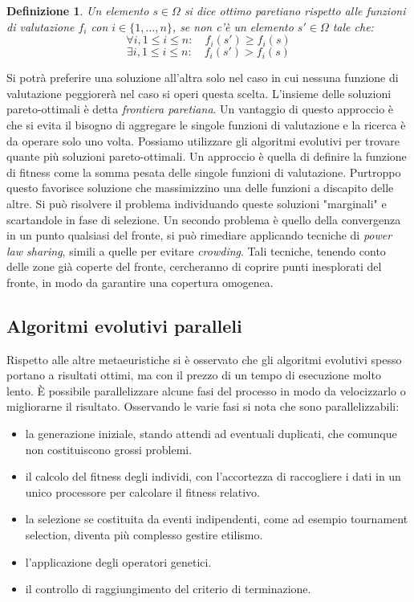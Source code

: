 \documentclass[10pt,a4paper]{article}
\newtheorem{definition}{Definizione}
\begin{document}
\begin{definition}
Un elemento $s \in \Omega$ si dice \emph{ottimo paretiano} rispetto alle funzioni di valutazione $f_i$ con $i \in \{1, \dots, n\}$, se non c'è un elemento $s' \in \Omega$ tale che:
$$
\forall i, 1 \leq i \leq n: \quad f_i(s') \geq f_i(s)
$$ 
$$
\exists i, 1 \leq i \leq n: \quad f_i(s') > f_i(s)
$$
\end{definition}

Si potrà preferire una soluzione all'altra solo nel caso in cui nessuna funzione di valutazione peggiorerà nel caso si operi questa scelta. L'insieme delle soluzioni pareto-ottimali è detta \emph{frontiera paretiana}. Un vantaggio di questo approccio è che si evita il bisogno di aggregare le singole funzioni di valutazione e la ricerca è da operare solo uno volta. Possiamo utilizzare gli algoritmi evolutivi per trovare quante più soluzioni pareto-ottimali. Un approccio è quella di definire la funzione di fitness come la somma pesata delle singole funzioni di valutazione. Purtroppo questo favorisce soluzione che massimizzino una delle funzioni a discapito delle altre. Si può risolvere il problema individuando queste soluzioni "marginali" e scartandole in fase di selezione. Un secondo problema è quello della convergenza in un punto qualsiasi del fronte, si può rimediare applicando tecniche di \emph{power law sharing}, simili a quelle per evitare \emph{crowding}. Tali tecniche, tenendo conto delle zone già coperte del fronte, cercheranno di coprire punti inesplorati del fronte, in modo da garantire una copertura omogenea.

\subsection{Algoritmi evolutivi paralleli}

Rispetto alle altre metaeuristiche si è osservato che gli algoritmi evolutivi spesso portano a risultati ottimi, ma con il prezzo di un tempo di esecuzione molto lento.
È possibile parallelizzare alcune fasi del processo in modo da velocizzarlo o migliorarne il risultato. Osservando le varie fasi si nota che sono parallelizzabili:

\begin{itemize}
\item{la generazione iniziale, stando attendi ad eventuali duplicati, che comunque non costituiscono grossi problemi.}
\item{il calcolo del fitness degli individi, con l’accortezza di raccogliere i dati in un unico processore per calcolare il fitness relativo.}
\item{la selezione se costituita da eventi indipendenti, come ad esempio tournament selection, diventa più complesso gestire etilismo.}
\item{l’applicazione degli operatori genetici.}
\item{il controllo di raggiungimento del criterio di terminazione.}
\end{itemize}
\end{document}
